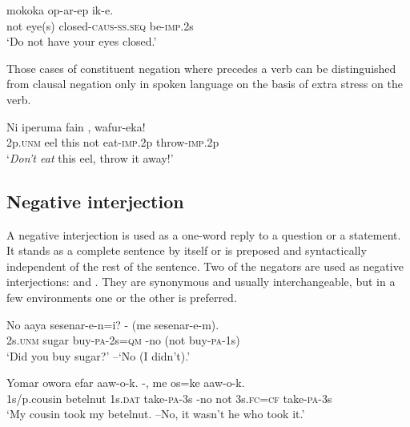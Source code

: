 \ea%
\label{ex:6:x1114}
\gll {}  mokoka  op-ar-ep  ik-e. \\
not  eye(s)  closed-\textsc{caus}-\textsc{ss}.\textsc{seq}  be-\textsc{imp}.2s\\
\glt `Do not have your eyes closed.'
\z

Those cases of constituent negation where   precedes a verb can be distinguished from clausal negation only in spoken language on the basis of extra stress on the verb.

\ea%
\label{ex:6:x1110}
\gll Ni  iperuma  fain    ,  wafur-eka! \\
2p.\textsc{unm}  eel  this  not  eat-\textsc{imp}.2p  throw-\textsc{imp}.2p\\
\glt `\textit{Don't eat}  this eel, throw it away!'
\z

\subsection{Negative interjection} \label{sec:6.2.3}

A negative interjection is used as a one-word reply to a question or a statement. It stands as a complete sentence by itself or is preposed and syntactically independent of the rest of the sentence. Two of the negators are used as negative interjections:  and . They are synonymous and usually interchangeable, but in a few environments one or the other is preferred.

\ea%
\label{ex:6:x1115}
\gll No  aaya  sesenar-e-n=i?  -  (me  sesenar-e-m). \\
2s.\textsc{unm}  sugar  buy-\textsc{pa}-2s=\textsc{qm}  -no  (not  buy-\textsc{pa}-1s)\\
\glt `Did you buy sugar?' --`No (I didn't).'
\z

\ea%
\label{ex:6:x1116}
\gll Yomar  owora  efar  aaw-o-k. -,  me  os=ke  aaw-o-k.\\
1s/p.cousin  betelnut  1s.\textsc{dat}  take-\textsc{pa}-3s -no  not  3s.\textsc{fc}=\textsc{cf}  take-\textsc{pa}-3s\\
\glt `My cousin took my betelnut. --No, it wasn't he who took it.'
\z

